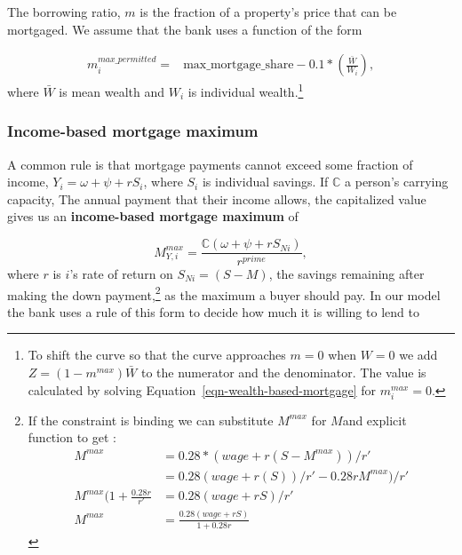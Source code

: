 {The borrowing ratio, $m$ is the fraction of a property's price that can be mortgaged. We assume that the bank uses a function of the form 


\begin{align}
m_i^{max\_permitted} =& \mathrm{max\_mortgage\_share} - 0.1*\left(\frac{\bar W}{ W_i}\right), \label{eqn-wealth-based-mortgage}  %
\end{align} 
where $\bar{W}$ is mean wealth and $W_i$ is individual wealth.\footnote{To shift the curve  so that the curve approaches $m=0$ when $W=0$ we add  $Z=(1-m^{max})\bar W$ to the numerator and the denominator. The value is calculated by solving Equation~\ref{eqn-wealth-based-mortgage} for {$m_i^{max}=0$}.}


\subsubsection{Income-based mortgage maximum}
A common rule is that mortgage payments cannot exceed some fraction of income, $Y_i=\omega+ \psi + {r}S_i$, where $S_i$ is individual savings.
If $\mathbb{C}$ a person's carrying capacity, The annual payment that their income allows,  the capitalized value gives us an \textbf{income-based  mortgage maximum} of 


\begin{equation}
M^{max}_{Y,i} = \frac{\mathbb{C} (\omega+ \psi + {r}S_{Ni})}{r^{prime}},\label{eqn-income-based-mortgage}    
\end{equation}
where ${r}$ is $i$'s rate of return on  $S_{Ni}=(S-M)$, the savings remaining after making the down payment,\footnote{If the constraint is binding we can  substitute $M^{max}$ for $M$and explicit function to get :
\begin{align}
M^{max}      &= 0.28 * (wage + r (S-M^{max})) / r'\nonumber\\
         &= 0.28 (wage + r (S)) / r' - 0.28 rM^{max}) / r'\nonumber\\
M^{max}(1+\frac{0.28 r}{r'}&=0.28 (wage + r S) / r'\nonumber\\
M^{max}   &=  \frac{0.28 (wage + r S )} {1+0.28 r}\nonumber   
\end{align}
} as the maximum a buyer should pay. %
In our model the bank uses a rule of this form to decide how much it is willing to lend to 

}
